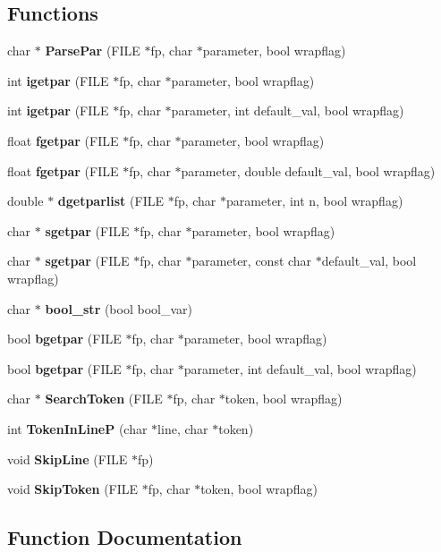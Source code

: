 \subsection*{Functions}
\begin{DoxyCompactItemize}
\item 
char $\ast$ {\bf Parse\-Par} (F\-I\-L\-E $\ast$fp, char $\ast$parameter, bool wrapflag)
\item 
int {\bf igetpar} (F\-I\-L\-E $\ast$fp, char $\ast$parameter, bool wrapflag)
\item 
int {\bf igetpar} (F\-I\-L\-E $\ast$fp, char $\ast$parameter, int default\-\_\-val, bool wrapflag)
\item 
float {\bf fgetpar} (F\-I\-L\-E $\ast$fp, char $\ast$parameter, bool wrapflag)
\item 
float {\bf fgetpar} (F\-I\-L\-E $\ast$fp, char $\ast$parameter, double default\-\_\-val, bool wrapflag)
\item 
double $\ast$ {\bf dgetparlist} (F\-I\-L\-E $\ast$fp, char $\ast$parameter, int n, bool wrapflag)
\item 
char $\ast$ {\bf sgetpar} (F\-I\-L\-E $\ast$fp, char $\ast$parameter, bool wrapflag)
\item 
char $\ast$ {\bf sgetpar} (F\-I\-L\-E $\ast$fp, char $\ast$parameter, const char $\ast$default\-\_\-val, bool wrapflag)
\item 
char $\ast$ {\bf bool\-\_\-str} (bool bool\-\_\-var)
\item 
bool {\bf bgetpar} (F\-I\-L\-E $\ast$fp, char $\ast$parameter, bool wrapflag)
\item 
bool {\bf bgetpar} (F\-I\-L\-E $\ast$fp, char $\ast$parameter, int default\-\_\-val, bool wrapflag)
\item 
char $\ast$ {\bf Search\-Token} (F\-I\-L\-E $\ast$fp, char $\ast$token, bool wrapflag)
\item 
int {\bf Token\-In\-Line\-P} (char $\ast$line, char $\ast$token)
\item 
void {\bf Skip\-Line} (F\-I\-L\-E $\ast$fp)
\item 
void {\bf Skip\-Token} (F\-I\-L\-E $\ast$fp, char $\ast$token, bool wrapflag)
\end{DoxyCompactItemize}


\subsection{Function Documentation}
